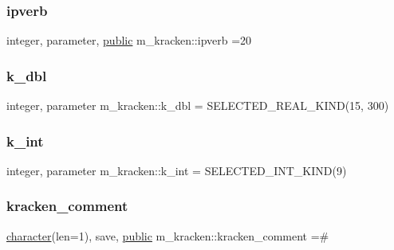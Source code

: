 \subsubsection{\texorpdfstring{ipverb}{ipverb}}
{\footnotesize\ttfamily integer, parameter, \hyperlink{M__stopwatch_83_8txt_a2f74811300c361e53b430611a7d1769f}{public} m\+\_\+kracken\+::ipverb =20}

\mbox{\label{namespacem__kracken_a002abf985e8365e06a05ebde2f2b9b52}} 
\subsubsection{\texorpdfstring{k\+\_\+dbl}{k\_dbl}}
{\footnotesize\ttfamily integer, parameter m\+\_\+kracken\+::k\+\_\+dbl = S\+E\+L\+E\+C\+T\+E\+D\+\_\+\+R\+E\+A\+L\+\_\+\+K\+I\+ND(15, 300)\hspace{0.3cm}{\ttfamily [private]}}

\mbox{\label{namespacem__kracken_ae51c6f835203dd09fc3be239fc9d0ce1}} 
\subsubsection{\texorpdfstring{k\+\_\+int}{k\_int}}
{\footnotesize\ttfamily integer, parameter m\+\_\+kracken\+::k\+\_\+int = S\+E\+L\+E\+C\+T\+E\+D\+\_\+\+I\+N\+T\+\_\+\+K\+I\+ND(9)\hspace{0.3cm}{\ttfamily [private]}}

\mbox{\label{namespacem__kracken_ac26b840ca27114f5efb8fcbf48e184b4}} 
\subsubsection{\texorpdfstring{kracken\+\_\+comment}{kracken\_comment}}
{\footnotesize\ttfamily \hyperlink{option__stopwatch_83_8txt_abd4b21fbbd175834027b5224bfe97e66}{character}(len=1), save, \hyperlink{M__stopwatch_83_8txt_a2f74811300c361e53b430611a7d1769f}{public} m\+\_\+kracken\+::kracken\+\_\+comment =\textquotesingle{}\#\textquotesingle{}}

